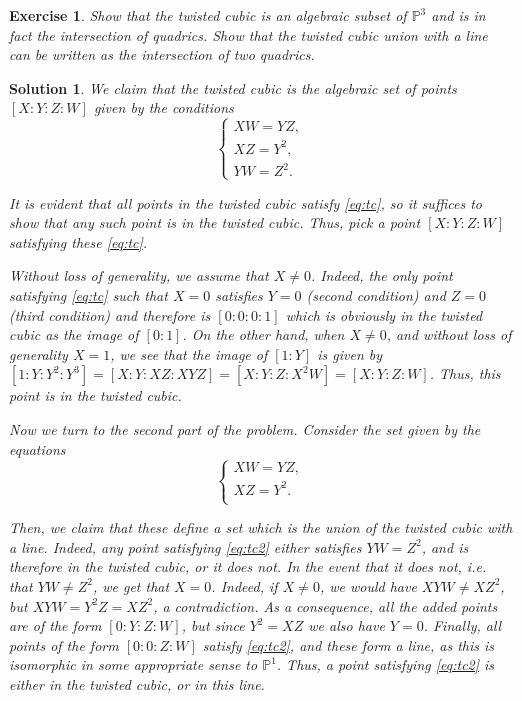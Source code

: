 \documentclass{article}
\newtheorem{ex}{Exercise}
\theoremstyle{nonumberplain}
\newtheorem{sol}{Solution}
\newcommand{\PP}{\mathbb{P}}
\begin{document}
\begin{ex}
Show that the twisted cubic is an algebraic subset of $\PP^3$ and is in fact the intersection of quadrics. Show that the twisted cubic union with a line can be written as the intersection of two quadrics.
\end{ex}

\begin{sol}
We claim that the twisted cubic is the algebraic set of points $[X:Y:Z:W]$ given by the conditions
\begin{equation}\label{eq:tc}
\begin{cases}
XW = YZ,\\
XZ = Y^2,\\
YW = Z^2.
\end{cases}
\end{equation}

It is evident that all points in the twisted cubic satisfy \eqref{eq:tc}, so it suffices to show that any such point is in the twisted cubic. Thus, pick a point $[X:Y:Z:W]$ satisfying these \eqref{eq:tc}.

Without loss of generality, we assume that $X \neq 0$. Indeed, the only point satisfying \eqref{eq:tc} such that $X = 0$ satisfies $Y = 0$ (second condition) and $Z = 0$ (third condition) and therefore is $[0:0:0:1]$ which is obviously in the twisted cubic as the image of $[0:1]$. On the other hand, when $X \neq 0$, and without loss of generality $X = 1$, we see that the image of $[1:Y]$ is given by $[1 : Y : Y^2 : Y^3] = [X:Y:XZ: X Y Z] = [X:Y:Z:X^2 W] = [X:Y:Z:W]$. Thus, this point is in the twisted cubic.

\smallskip

Now we turn to the second part of the problem. Consider the set given by the equations
\begin{equation}\label{eq:tc2}
\begin{cases}
XW = YZ,\\
XZ = Y^2.\\
\end{cases}
\end{equation}

Then, we claim that these define a set which is the union of the twisted cubic with a line. Indeed, any point satisfying \eqref{eq:tc2} either satisfies $YW = Z^2$, and is therefore in the twisted cubic, or it does not. In the event that it does not, i.e. that $YW \neq Z^2$, we get that $X = 0$. Indeed, if $X \neq 0$, we would have $XYW \neq XZ^2$, but $XYW = Y^2 Z = XZ^2$, a contradiction. As a consequence, all the added points are of the form $[0:Y:Z:W]$, but since $Y^2 = XZ$ we also have $Y = 0$. Finally, all points of the form $[0:0:Z:W]$ satisfy \eqref{eq:tc2}, and these form a line, as this is isomorphic in some appropriate sense to $\PP^1$. Thus, a point satisfying \eqref{eq:tc2} is either in the twisted cubic, or in this line. 
\end{sol}
\end{document}
